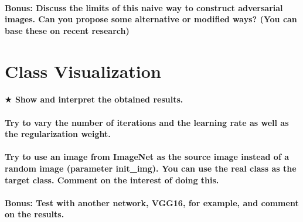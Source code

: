 \paragraph*{\textbf{Bonus:} Discuss the limits of this naive way to construct adversarial images. Can you propose some alternative or modiﬁed ways? (You can base these on recent research)}


\section{Class Visualization}
\paragraph*{$ \bigstar $ Show and interpret the obtained results.}
\paragraph*{Try to vary the number of iterations and the learning rate as well as the regularization weight.}
\paragraph*{Try to use an image from ImageNet as the source image instead of a random image (parameter init\_img). You can use the real class as the target class. Comment on the interest of doing this.}
\paragraph*{\textbf{Bonus:} Test with another network, VGG16, for example, and comment on the results.}